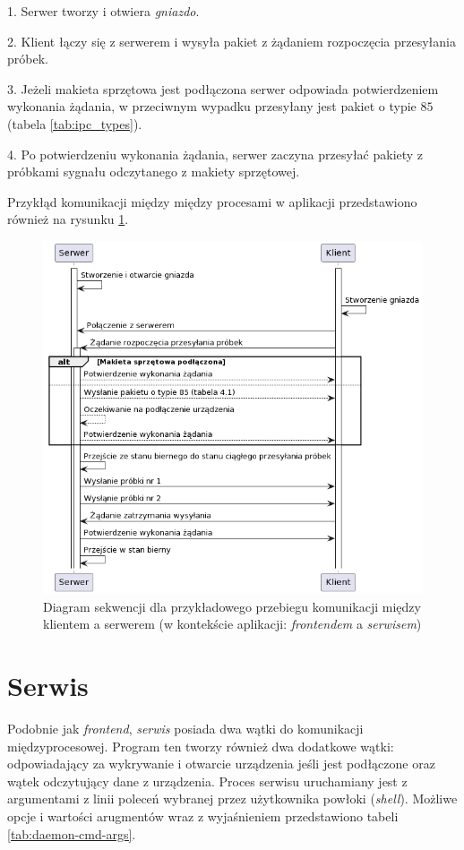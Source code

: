 1. Serwer tworzy i otwiera \textit{gniazdo}.

2. Klient łączy się z serwerem i wysyła pakiet z żądaniem rozpoczęcia przesyłania próbek.

3. Jeżeli makieta sprzętowa jest podłączona serwer odpowiada potwierdzeniem wykonania żądania,
w przeciwnym wypadku przesyłany jest pakiet o typie $85$ (tabela \ref{tab:ipc_types}).

4. Po potwierdzeniu wykonania żądania, serwer zaczyna przesyłać pakiety z próbkami sygnału odczytanego z makiety sprzętowej.

Przykłąd komunikacji między między procesami w aplikacji przedstawiono również na rysunku \ref{fig:ipc_seq}.

\begin{figure}[h!]
    \centering 
    \includegraphics[scale=0.75]{pl/media/ipc_sequence.png}
    \caption{Diagram sekwencji dla przykładowego przebiegu komunikacji między klientem a serwerem (w kontekście aplikacji: 
    \textit{frontendem} a \textit{serwisem})}
    \label{fig:ipc_seq}
\end{figure}

\newpage

\section{Serwis}

Podobnie jak \textit{frontend}, \textit{serwis} posiada dwa wątki do komunikacji międzyprocesowej.
Program ten tworzy również dwa dodatkowe wątki: odpowiadający za wykrywanie i otwarcie urządzenia jeśli jest podłączone
oraz wątek odczytujący dane z urządzenia.
Proces serwisu uruchamiany jest z argumentami z linii poleceń wybranej przez użytkownika powłoki
(\textit{shell}). Możliwe opcje i wartości arugmentów wraz z wyjaśnieniem przedstawiono tabeli \ref{tab:daemon-cmd-args}.

